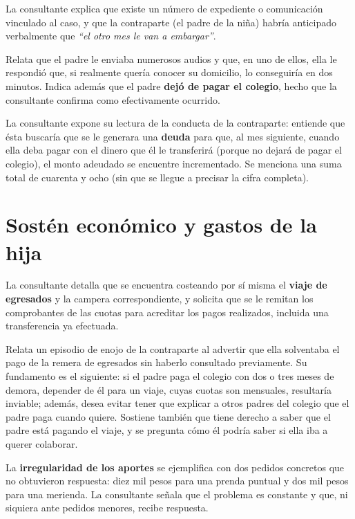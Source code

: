 \documentclass[12pt,oneside]{book}
\begin{document}
La consultante explica que existe un n\'umero de expediente o comunicaci\'on vinculado al caso, y que la contraparte (el padre de la ni\~na) habr\'ia anticipado verbalmente que \textit{``el otro mes le van a embargar''}.

Relata que el padre le enviaba numerosos audios y que, en uno de ellos, ella le respondi\'o que, si realmente quer\'ia conocer su domicilio, lo conseguir\'ia en dos minutos. Indica adem\'as que el padre \textbf{dej\'o de pagar el colegio}, hecho que la consultante confirma como efectivamente ocurrido.

La consultante expone su lectura de la conducta de la contraparte: entiende que \'esta buscar\'ia que se le generara una \textbf{deuda} para que, al mes siguiente, cuando ella deba pagar con el dinero que \'el le transferir\'a (porque no dejar\'a de pagar el colegio), el monto adeudado se encuentre incrementado. Se menciona una suma total de cuarenta y ocho (sin que se llegue a precisar la cifra completa).

\section{Sost\'en econ\'omico y gastos de la hija}

La consultante detalla que se encuentra costeando por s\'i misma el \textbf{viaje de egresados} y la campera correspondiente, y solicita que se le remitan los comprobantes de las cuotas para acreditar los pagos realizados, incluida una transferencia ya efectuada.

Relata un episodio de enojo de la contraparte al advertir que ella solventaba el pago de la remera de egresados sin haberlo consultado previamente. Su fundamento es el siguiente: si el padre paga el colegio con dos o tres meses de demora, depender de \'el para un viaje, cuyas cuotas son mensuales, resultar\'ia inviable; adem\'as, desea evitar tener que explicar a otros padres del colegio que el padre paga cuando quiere. Sostiene tambi\'en que tiene derecho a saber que el padre est\'a pagando el viaje, y se pregunta c\'omo \'el podr\'ia saber si ella iba a querer colaborar.

La \textbf{irregularidad de los aportes} se ejemplifica con dos pedidos concretos que no obtuvieron respuesta: diez mil pesos para una prenda puntual y dos mil pesos para una merienda. La consultante se\~nala que el problema es constante y que, ni siquiera ante pedidos menores, recibe respuesta.
\end{document}
